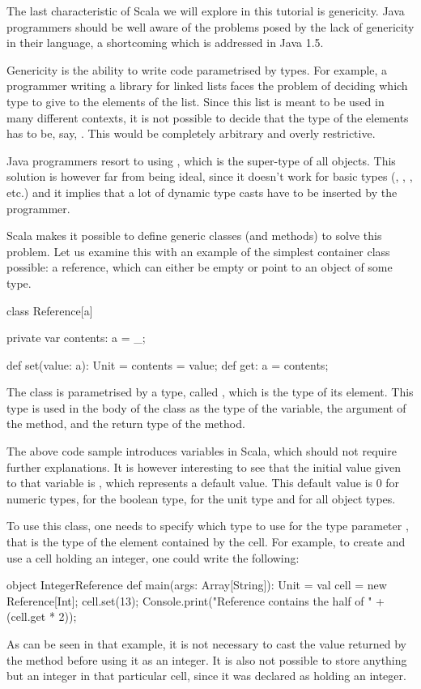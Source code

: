 \documentclass[a4paper,12pt,twoside,titlepage]{article}
\newcommand{\langname}[1]{#1\xspace}
\newcommand{\Scala}{\langname{Scala}}
\newcommand{\Java}{\langname{Java}}
\begin{document}
The last characteristic of \Scala we will explore in this tutorial is
genericity. \Java programmers should be well aware of the problems
posed by the lack of genericity in their language, a shortcoming which
is addressed in \Java 1.5.

Genericity is the ability to write code parametrised by types. For
example, a programmer writing a library for linked lists faces the
problem of deciding which type to give to the elements of the list.
Since this list is meant to be used in many different contexts, it is
not possible to decide that the type of the elements has to be, say,
. This would be completely arbitrary and overly
restrictive.

\Java programmers resort to using , which is the
super-type of all objects. This solution is however far from being
ideal, since it doesn't work for basic types (,
, , etc.) and it implies that a lot of
dynamic type casts have to be inserted by the programmer.

\Scala makes it possible to define generic classes (and methods) to
solve this problem. Let us examine this with an example of the
simplest container class possible: a reference, which can either be
empty or point to an object of some type.
\begin{scalacode}
class Reference[a] {
  private var contents: a = _;

  def set(value: a): Unit = { contents = value; }
  def get: a = contents;
}
\end{scalacode}
The class  is parametrised by a type, called ,
which is the type of its element. This type is used in the body of the
class as the type of the  variable, the argument of
the  method, and the return type of the  method.

The above code sample introduces variables in \Scala, which should not
require further explanations. It is however interesting to see that
the initial value given to that variable is \code{_}, which represents
a default value. This default value is 0 for numeric types,
 for the boolean type, \code{()} for the unit type and
 for all object types.

To use this  class, one needs to specify which type to use
for the type parameter , that is the type of the element
contained by the cell. For example, to create and use a cell holding
an integer, one could write the following:
\begin{scalacode}
object IntegerReference {
  def main(args: Array[String]): Unit = {
    val cell = new Reference[Int];
    cell.set(13);
    Console.print("Reference contains the half of " + (cell.get * 2));
  }
}
\end{scalacode}
As can be seen in that example, it is not necessary to cast the value
returned by the  method before using it as an integer. It
is also not possible to store anything but an integer in that
particular cell, since it was declared as holding an integer.
\end{document}
